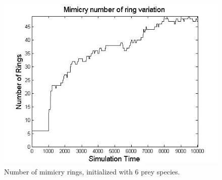 \begin{figure}[H]
	\centering
	\includegraphics[scale=0.50]{images/ringSize10k-6Prey}
	\caption[Number of mimicry rings (6 prey species)]{Number of mimicry rings, initialized with 6 prey species.}
	\label{fig:ringSize10k-6-Prey}
\end{figure}

